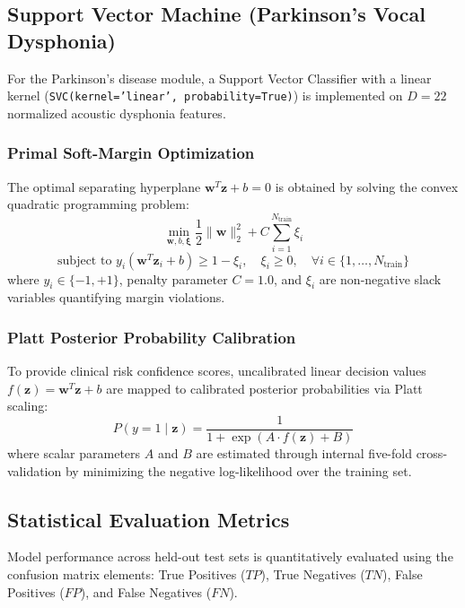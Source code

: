\subsection{Support Vector Machine (Parkinson's Vocal Dysphonia)}
For the Parkinson's disease module, a Support Vector Classifier with a linear kernel (\texttt{SVC(kernel='linear', probability=True)}) is implemented on $D = 22$ normalized acoustic dysphonia features.

\subsubsection{Primal Soft-Margin Optimization}
The optimal separating hyperplane $\mathbf{w}^T \mathbf{z} + b = 0$ is obtained by solving the convex quadratic programming problem:
\begin{equation}
    \min_{\mathbf{w}, b, \boldsymbol{\xi}} \frac{1}{2} \|\mathbf{w}\|_2^2 + C \sum_{i=1}^{N_{\text{train}}} \xi_i
    \label{eq:svm_primal}
\end{equation}
\begin{equation}
    \text{subject to } y_i \left(\mathbf{w}^T \mathbf{z}_i + b\right) \ge 1 - \xi_i, \quad \xi_i \ge 0, \quad \forall i \in \{1, \dots, N_{\text{train}}\}
    \label{eq:svm_constraints}
\end{equation}
where $y_i \in \{-1, +1\}$, penalty parameter $C = 1.0$, and $\xi_i$ are non-negative slack variables quantifying margin violations.

\subsubsection{Platt Posterior Probability Calibration}
To provide clinical risk confidence scores, uncalibrated linear decision values $f(\mathbf{z}) = \mathbf{w}^T \mathbf{z} + b$ are mapped to calibrated posterior probabilities via Platt scaling:
\begin{equation}
    P(y = 1 \mid \mathbf{z}) = \frac{1}{1 + \exp\left(A \cdot f(\mathbf{z}) + B\right)}
    \label{eq:platt_scaling}
\end{equation}
where scalar parameters $A$ and $B$ are estimated through internal five-fold cross-validation by minimizing the negative log-likelihood over the training set.

\subsection{Statistical Evaluation Metrics}
Model performance across held-out test sets is quantitatively evaluated using the confusion matrix elements: True Positives ($TP$), True Negatives ($TN$), False Positives ($FP$), and False Negatives ($FN$).

